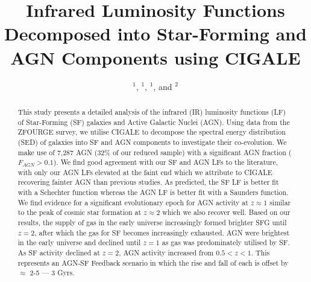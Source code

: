 


\title{Infrared Luminosity Functions Decomposed into Star-Forming and AGN Components using CIGALE}

\author{ $^{1}$,  
         $^{1}$,
         $^{1}$,
        and  $^{2}$}





\begin{abstract}
    This study presents a detailed analysis of the infrared (IR) luminosity functions (LF) of Star-Forming (SF) galaxies and Active Galactic Nuclei (AGN). Using data from the ZFOURGE survey, we utilise CIGALE to decompose the spectral energy distribution (SED) of galaxies into SF and AGN components to investigate their co-evolution. We make use of 7,287 AGN (32\% of our reduced sample) with a significant AGN fraction ($F_{AGN} > 0.1$). We find good agreement with our SF and AGN LFs to the literature, with only our AGN LFs elevated at the faint end which we attribute to CIGALE recovering fainter AGN than previous studies. As predicted, the SF LF is better fit with a Schechter function whereas the AGN LF is better fit with a Saunders function. We find evidence for a significant evolutionary epoch for AGN activity at $z \approx 1$ similar to the peak of cosmic star formation at $z \approx 2$ which we also recover well. Based on our results, the supply of gas in the early universe increasingly formed brighter SFG until $z=2$, after which the gas for SF becomes increasingly exhausted. AGN were brightest in the early universe and declined until $z=1$ as gas was predominately utilised by SF. As SF activity declined at $z=2$, AGN activity increased from $0.5<z<1$. This represents an AGN-SF Feedback scenario in which the rise and fall of each is offset by $\approx$ 2-5 --- 3 Gyrs. 
\end{abstract}

